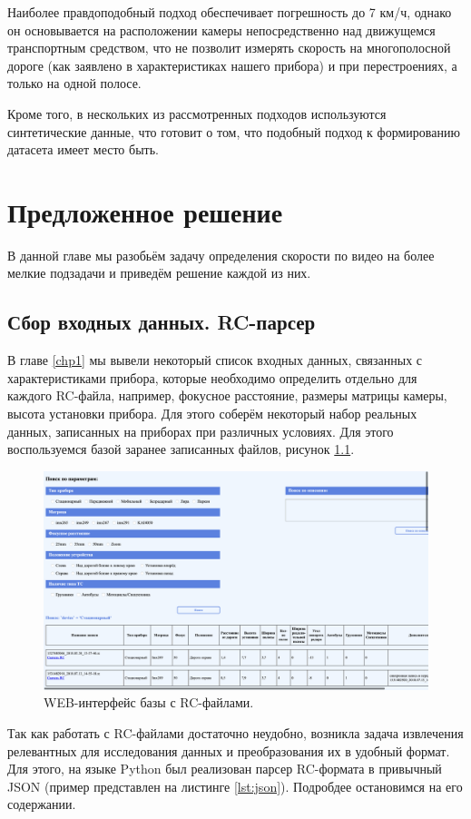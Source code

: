 \documentclass[specification,annotation,times]{itmo-student-thesis}
\begin{document}
	Наиболее правдоподобный подход обеспечивает погрешность до 7 км/ч, однако он основывается на расположении камеры непосредственно над движущемся транспортным средством, что не позволит измерять скорость на многополосной дороге (как заявлено в характеристиках нашего прибора) и при перестроениях, а только на одной полосе.
	
	Кроме того, в нескольких из рассмотренных подходов используются синтетические данные, что готовит о том, что подобный подход к формированию датасета имеет место быть.
	
	\chapter{Предложенное решение}
	В данной главе мы разобьём задачу определения скорости по видео на более мелкие подзадачи и  приведём решение каждой из них. 
	
	\section{Сбор входных данных. RC-парсер}
	В главе \ref{chp1} мы вывели некоторый список входных данных, связанных с характеристиками прибора, которые необходимо определить отдельно для каждого RC-файла, например, фокусное расстояние, размеры матрицы камеры, высота установки прибора. Для этого соберём некоторый набор реальных данных, записанных на приборах при различных условиях. Для этого воспользуемся базой заранее записанных файлов, рисунок \ref{img:web-rc}.
	
	\begin{figure}[!ht]
		\caption{WEB-интерфейс базы с RC-файлами.}\label{img:web-rc}
		\includegraphics[width=0.85\linewidth]{../png/web_rc.png}
		\centering
	\end{figure}
	
	Так как работать с  RC-файлами достаточно неудобно, возникла задача извлечения релевантных для исследования данных и преобразования их в удобный формат. Для этого, на языке Python был реализован парсер RC-формата в привычный JSON (пример представлен на листинге \ref{lst:json}). Подробдее остановимся на его содержании.
	
\end{document}
